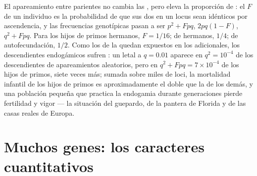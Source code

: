 \begin{proposition}[La endogamia]\label{prop:b2:population-genetics:inbreeding}
El apareamiento entre parientes no cambia las , pero
eleva la proporción de : el \emph{} $F$
de un individuo es la probabilidad de que sus dos  en un locus sean
idénticos por ascendencia, y las frecuencias genotípicas pasan a ser
$p^{2} + Fpq$, $2pq(1 - F)$, $q^{2} + Fpq$. Para los
hijos de primos hermanos, $F = 1/16$; de hermanos, $1/4$; de
autofecundación, $1/2$. Como los   de la 
quedan expuestos en los  adicionales, los descendientes
endogámicos sufren \emph{}: un  letal a
$q = 0.01$ aparece en $q^{2} = 10^{-4}$ de los descendientes de
apareamientos aleatorios, pero en
$q^{2} + Fpq = 7\times 10^{-4}$ de los hijos de primos, siete veces más;
sumada sobre miles de loci, la mortalidad infantil de los hijos de primos
es aproximadamente el doble que la de los demás, y una población pequeña
que practica la endogamia durante generaciones pierde fertilidad y vigor
--- la situación del guepardo, de la pantera de Florida y de las casas
reales de Europa.
\end{proposition}

\section{Muchos genes: los caracteres cuantitativos}

